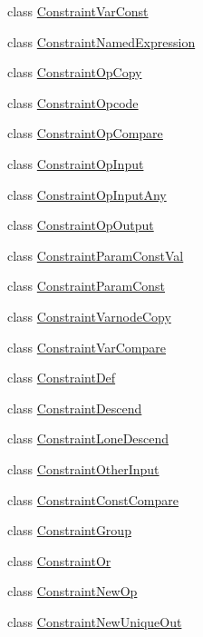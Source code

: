 \begin{DoxyCompactItemize}
\item 
class \mbox{\hyperlink{class_constraint_var_const}{Constraint\+Var\+Const}}
\item 
class \mbox{\hyperlink{class_constraint_named_expression}{Constraint\+Named\+Expression}}
\item 
class \mbox{\hyperlink{class_constraint_op_copy}{Constraint\+Op\+Copy}}
\item 
class \mbox{\hyperlink{class_constraint_opcode}{Constraint\+Opcode}}
\item 
class \mbox{\hyperlink{class_constraint_op_compare}{Constraint\+Op\+Compare}}
\item 
class \mbox{\hyperlink{class_constraint_op_input}{Constraint\+Op\+Input}}
\item 
class \mbox{\hyperlink{class_constraint_op_input_any}{Constraint\+Op\+Input\+Any}}
\item 
class \mbox{\hyperlink{class_constraint_op_output}{Constraint\+Op\+Output}}
\item 
class \mbox{\hyperlink{class_constraint_param_const_val}{Constraint\+Param\+Const\+Val}}
\item 
class \mbox{\hyperlink{class_constraint_param_const}{Constraint\+Param\+Const}}
\item 
class \mbox{\hyperlink{class_constraint_varnode_copy}{Constraint\+Varnode\+Copy}}
\item 
class \mbox{\hyperlink{class_constraint_var_compare}{Constraint\+Var\+Compare}}
\item 
class \mbox{\hyperlink{class_constraint_def}{Constraint\+Def}}
\item 
class \mbox{\hyperlink{class_constraint_descend}{Constraint\+Descend}}
\item 
class \mbox{\hyperlink{class_constraint_lone_descend}{Constraint\+Lone\+Descend}}
\item 
class \mbox{\hyperlink{class_constraint_other_input}{Constraint\+Other\+Input}}
\item 
class \mbox{\hyperlink{class_constraint_const_compare}{Constraint\+Const\+Compare}}
\item 
class \mbox{\hyperlink{class_constraint_group}{Constraint\+Group}}
\item 
class \mbox{\hyperlink{class_constraint_or}{Constraint\+Or}}
\item 
class \mbox{\hyperlink{class_constraint_new_op}{Constraint\+New\+Op}}
\item 
class \mbox{\hyperlink{class_constraint_new_unique_out}{Constraint\+New\+Unique\+Out}}

\end{DoxyCompactItemize}
